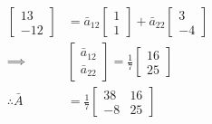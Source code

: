 \documentclass[11pt,twoside]{nsf_jwg} %
\begin{document}
\begin{enumerate}
\begin{align*}
\begin{bmatrix}13\\
-12
\end{bmatrix} & =\bar{a}_{12}\begin{bmatrix}1\\
1
\end{bmatrix}+\bar{a}_{22}\begin{bmatrix}3\\
-4
\end{bmatrix}\\
\implies & \begin{bmatrix}\bar{a}_{12}\\
\bar{a}_{22}
\end{bmatrix}=\frac{1}{7}\begin{bmatrix}16\\
25
\end{bmatrix}\\
\therefore\bar{A} & =\frac{1}{7}\begin{bmatrix}38 & 16\\
-8 & 25
\end{bmatrix} %
\end{align*}
\end{enumerate}
\end{document}
